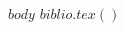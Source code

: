 \documentclass[10pt,A4,english]{article}
\begin{document}
\begin{paracol}{2}
\begin{leftcolumn}
	\end{leftcolumn}

	\begin{rightcolumn}
		$body$
		$biblio.tex()$
	\end{rightcolumn}
\end{paracol}
\end{document}
